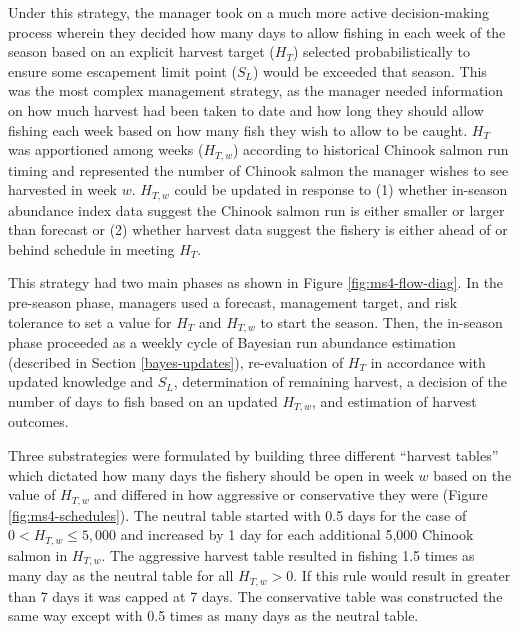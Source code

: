 \documentclass[12pt,]{book}
\theoremstyle{definition}
\theoremstyle{definition}
\theoremstyle{definition}
\theoremstyle{remark}
\begin{document}
\noindent
Under this strategy, the manager took on a much more active
decision-making process wherein they decided how many days to allow
fishing in each week of the season based on an explicit harvest target
(\(H_T\)) selected probabilistically to ensure some escapement limit
point (\(S_L\)) would be exceeded that season. This was the most complex
management strategy, as the manager needed information on how much
harvest had been taken to date and how long they should allow fishing
each week based on how many fish they wish to allow to be caught.
\(H_T\) was apportioned among weeks (\(H_{T,w}\)) according to
historical Chinook salmon run timing and represented the number of
Chinook salmon the manager wishes to see harvested in week \(w\).
\(H_{T,w}\) could be updated in response to (1) whether in-season
abundance index data suggest the Chinook salmon run is either smaller or
larger than forecast or (2) whether harvest data suggest the fishery is
either ahead of or behind schedule in meeting \(H_T\).

This strategy had two main phases as shown in Figure
\ref{fig:ms4-flow-diag}. In the pre-season phase, managers used a
forecast, management target, and risk tolerance to set a value for
\(H_T\) and \(H_{T,w}\) to start the season. Then, the in-season phase
proceeded as a weekly cycle of Bayesian run abundance estimation
(described in Section \ref{bayes-updates}), re-evaluation of \(H_T\) in
accordance with updated knowledge and \(S_L\), determination of
remaining harvest, a decision of the number of days to fish based on an
updated \(H_{T,w}\), and estimation of harvest outcomes.

Three substrategies were formulated by building three different
``harvest tables'' which dictated how many days the fishery should be
open in week \(w\) based on the value of \(H_{T,w}\) and differed in how
aggressive or conservative they were (Figure \ref{fig:ms4-schedules}).
The neutral table started with 0.5 days for the case of
\(0 < H_{T,w} \le 5,000\) and increased by 1 day for each additional
5,000 Chinook salmon in \(H_{T,w}\). The aggressive harvest table
resulted in fishing 1.5 times as many day as the neutral table for all
\(H_{T,w} > 0\). If this rule would result in greater than 7 days it was
capped at 7 days. The conservative table was constructed the same way
except with 0.5 times as many days as the neutral table.
\end{document}
